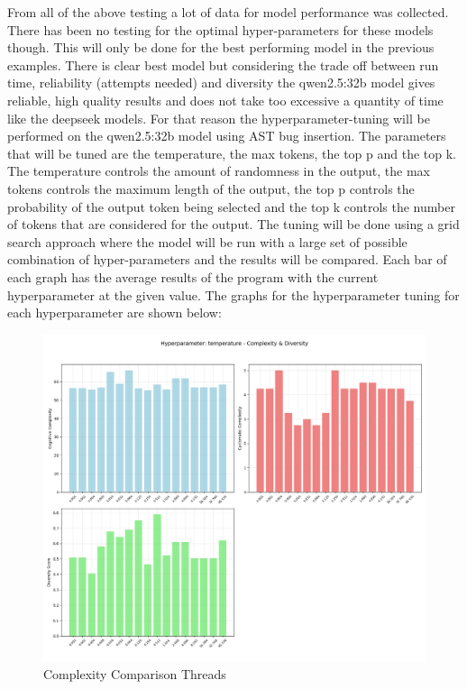 \documentclass[12pt]{extarticle}
\begin{document}
From all of the above testing a lot of data for model performance was collected. There has been no testing for the optimal hyper-parameters for these models though. This will only be done for the best performing model in the previous examples. There is clear best model but considering the trade off between run time, reliability (attempts needed) and diversity the qwen2.5:32b model gives reliable, high quality results and does not take too excessive a quantity of time like the deepseek models. For that reason the hyperparameter-tuning will be performed on the qwen2.5:32b model using AST bug insertion. The parameters that will be tuned are the temperature, the max tokens, the top p and the top k. The temperature controls the amount of randomness in the output, the max tokens controls the maximum length of the output, the top p controls the probability of the output token being selected and the top k controls the number of tokens that are considered for the output. The tuning will be done using a grid search approach where the model will be run with a large set of possible combination of hyper-parameters and the results will be compared. Each bar of each graph has the average results of the program with the current hyperparameter at the given value. The graphs for the hyperparameter tuning for each hyperparameter are shown below:

\begin{figure}[H]
\centering
\includegraphics[width=0.7\linewidth]{Images/Hyperparam_temperature_Complexity.png}
\caption{Complexity Comparison Threads}
\label{fig:Complexity_Comparison_Threads}
\end{figure}
\end{document}

